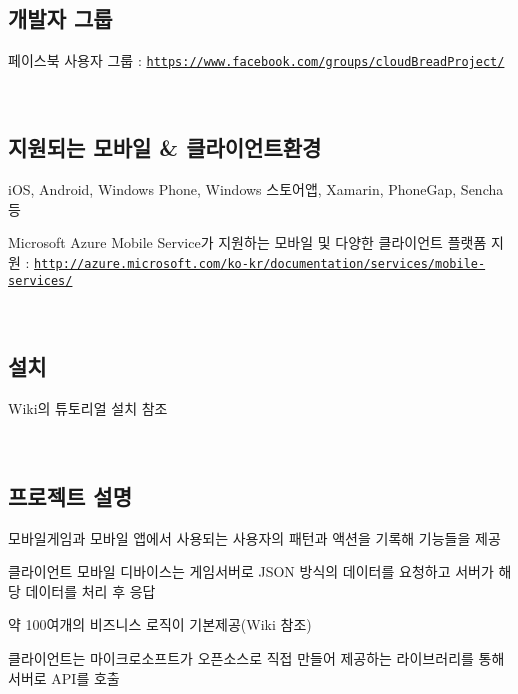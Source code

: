 ~\newline
 \subsection*{개발자 그룹}


\begin{DoxyItemize}
\item 페이스북 사용자 그룹 \+: \href{https://www.facebook.com/groups/cloudBreadProject/}{\tt https\+://www.\+facebook.\+com/groups/cloud\+Bread\+Project/}
\end{DoxyItemize}

~\newline
 \subsection*{지원되는 모바일 \& 클라이언트환경}


\begin{DoxyItemize}
\item i\+OS, Android, Windows Phone, Windows 스토어앱, Xamarin, Phone\+Gap, Sencha 등
\item Microsoft Azure Mobile Service가 지원하는 모바일 및 다양한 클라이언트 플랫폼 지원 \+: \href{http://azure.microsoft.com/ko-kr/documentation/services/mobile-services/}{\tt http\+://azure.\+microsoft.\+com/ko-\/kr/documentation/services/mobile-\/services/}
\end{DoxyItemize}

~\newline
 \subsection*{설치}


\begin{DoxyItemize}
\item Wiki의 튜토리얼 설치 참조
\end{DoxyItemize}

~\newline
 \subsection*{프로젝트 설명}


\begin{DoxyItemize}
\item 모바일게임과 모바일 앱에서 사용되는 사용자의 패턴과 액션을 기록해 기능들을 제공
\item 클라이언트 모바일 디바이스는 게임서버로 J\+S\+ON 방식의 데이터를 요청하고 서버가 해당 데이터를 처리 후 응답
\item 약 100여개의 비즈니스 로직이 기본제공(Wiki 참조)
\item 클라이언트는 마이크로소프트가 오픈소스로 직접 만들어 제공하는 라이브러리를 통해 서버로 A\+P\+I를 호출
\end{DoxyItemize}

